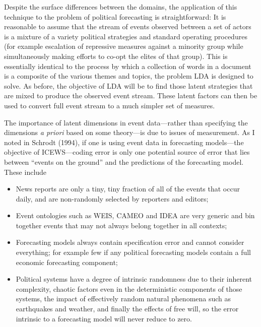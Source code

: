 \documentclass[graybox]{svmult}
\begin{document}
Despite the surface differences between the domains, the application of this technique to the problem of political forecasting is straightforward: It is reasonable to assume that the stream of events observed between a set of actors is a mixture of a variety political strategies and standard operating procedures (for example escalation of repressive measures against a minority group while simultaneously making efforts to co-opt the elites of that group). This is essentially identical to the process by which a collection of words in a document is a composite of the various themes and topics, the problem LDA is designed to solve. As before, the objective of LDA will be to find those latent strategies that are mixed to produce the observed event stream.  These latent factors can then be used to convert full event stream to a much simpler set of measures.

The importance of latent dimensions in event data---rather than specifying the dimensions \textit{a priori} based on some theory---is due to issues of measurement. As I noted in Schrodt (1994), if one is using event data in forecasting models---the objective of ICEWS---coding error is only one potential source of error that lies between ``events on the ground'' and the predictions of the forecasting model. These include

\begin{itemize}
\item News reports are only a tiny, tiny fraction of all of the events that occur daily, and are non-randomly selected by reporters and editors;

\item Event ontologies such as WEIS, CAMEO and IDEA are very generic and bin together events that may not always belong together in all contexts;

\item Forecasting models always contain specification error and cannot consider everything; for example few if any  political forecasting models contain a full economic forecasting component;

\item Political systems have a degree of intrinsic randomness due to their inherent complexity, chaotic factors even in the deterministic components of those systems, the impact of effectively random natural phenomena such as earthquakes and weather, and finally the effects of free will, so the error intrinsic to a forecasting model will never reduce to zero.

\end{itemize}
\end{document}
